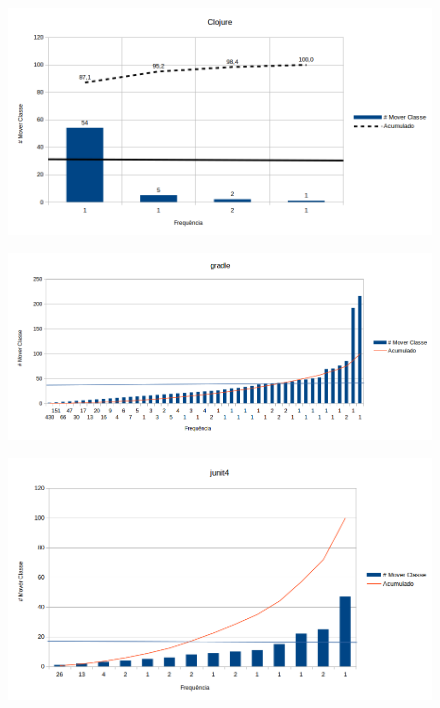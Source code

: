 \documentclass[12pt]{article}
\begin{document}
\begin{figure}[ht]
\centering
\includegraphics[width=0.9\linewidth]{../img/results-clojure}
\caption[Frequência de Mover Classe]{}
\label{fig:resultado-clojure}
\end{figure}

\begin{figure}
	\centering
	\includegraphics[width=0.9\linewidth]{../img/results-gradle}
	\caption[Frequência de Mover Classe]{}
	\label{fig:resultado-gradle}
\end{figure}


\begin{figure}
	\centering
	\includegraphics[width=0.9\linewidth]{../img/results-junit}
	\caption[Frequência de Mover Classe]{}
	\label{fig:resultado-junit}
\end{figure}
\end{document}
